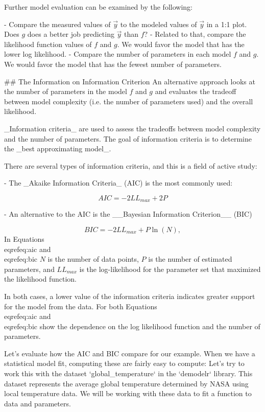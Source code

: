 \documentclass[
]{book}
\theoremstyle{definition}
\theoremstyle{definition}
\theoremstyle{definition}
\theoremstyle{remark}
\begin{document}
Further model evaluation can be examined by the following:

- Compare the measured values of $\vec{y}$ to the modeled values of $\vec{y}$ in a 1:1 plot.  Does $g$ does a better job predicting $\vec{y}$ than $f$?
- Related to that, compare the likelihood function values of $f$ and $g$. We would favor the model that has the lower log likelihood.
- Compare the number of parameters in each model $f$ and $g$.  We would favor the model that has the fewest number of parameters.


## The Information on Information Criterion
 An alternative approach looks at the number of parameters in the model $f$ and $g$ and evaluates the tradeoff between model complexity (i.e. the number of parameters used) and the overall likelihood. 
 
 _Information criteria_ are used to assess the tradeoffs between model complexity and the number of parameters.  The goal of information criteria is to determine the _best approximating model_.

There are several types of information criteria, and this is a field of active study:

- The _Akaike Information Criteria_ (AIC) is the most commonly used: 

\begin{equation} 
AIC = -2 LL_{max} + 2 P
\label{eq:aic}
\end{equation}

- An alternative to the AIC is the __Bayesian Information Criterion__ (BIC)

\begin{equation}
BIC = -2 LL_{max} + P \ln (N),
\label{eq:bic}
\end{equation}
In  Equations \\eqref{eq:aic} and \\eqref{eq:bic} $N$ is the number of data points, $P$ is the number of estimated parameters, and $LL_{max}$ is
the log-likelihood for the parameter set that maximized the likelihood function.


In both cases, a lower value of the information criteria indicates greater support for the model from the data.  For both Equations \\eqref{eq:aic} and \\eqref{eq:bic} show the dependence on the log likelihood function and the number of parameters.

Let's evaluate how the AIC and BIC compare for our example.  When we have a statistical model fit, computing these are fairly easy to compute:  Let's try to work this with the dataset `global_temperature` in the `demodelr` library.  This dataset represents the average global temperature determined by NASA using local temperature data.  We will be working with these data to fit a function to data and parameters.
\end{document}

